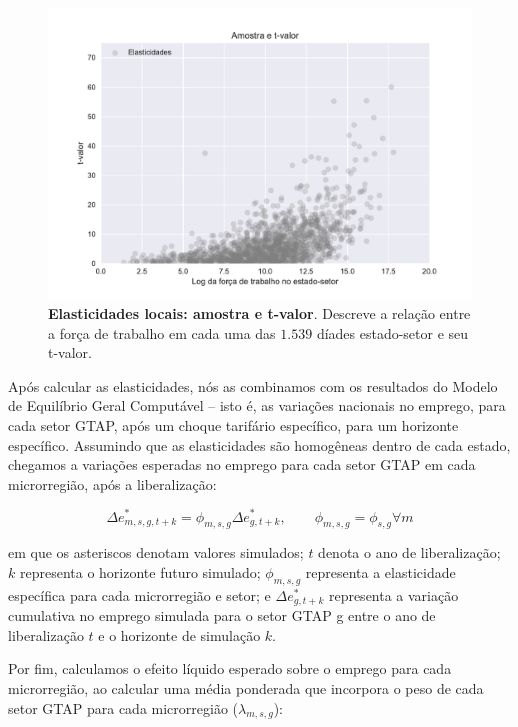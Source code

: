 \documentclass{article}
\begin{document}
\begin{figure}[ht!]
    \centering
    \includegraphics[scale=0.6]{amostra_scatter.pdf}
    \caption[Elasticidades locais: amostra e t-valor]{\textbf{Elasticidades locais: amostra e t-valor}. Descreve a relação entre a força de trabalho em cada uma das $1.539$ díades estado-setor e seu t-valor.}
    \label{fig:amostra_scatter}
\end{figure}

Após calcular as elasticidades, nós as combinamos com os resultados do Modelo de Equilíbrio Geral Computável – isto é, as variações nacionais no emprego, para cada setor GTAP, após um choque tarifário específico, para um horizonte específico. Assumindo que as elasticidades são homogêneas dentro de cada estado, chegamos a variações esperadas no emprego para cada setor GTAP em cada microrregião, após a liberalização:


\begin{equation}
    \Delta e_{m,s,g,t+k}^* = \phi_{m,s,g} \Delta e_{g,t+k}^*, \qquad \phi_{m,s,g} = \phi_{s,g} \forall m  
\end{equation}

em que os asteriscos denotam valores simulados; $t$ denota o ano de liberalização; $k$ representa o horizonte futuro simulado; $\phi_{m,s,g}$ representa a elasticidade específica para cada microrregião e setor; e $\Delta e_{g,t+k}^*$ representa a variação cumulativa no emprego simulada para o setor GTAP g entre o ano de liberalização $t$ e o horizonte de simulação $k$. 

Por fim, calculamos o efeito líquido esperado sobre o emprego para cada microrregião, ao calcular uma média ponderada que incorpora o peso de cada setor GTAP para cada microrregião ($\lambda_{m,s,g}$):
\end{document}
